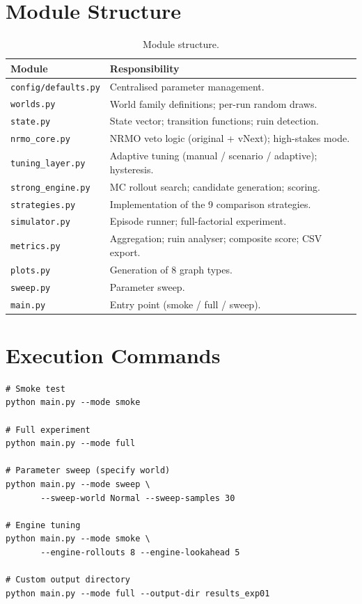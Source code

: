 \section{Module Structure}
\label{sec:vnext-modules}

\begin{table}[ht]
\centering
\small
\begin{tabularx}{\linewidth}{lX}
\toprule
\textbf{Module} & \textbf{Responsibility} \\
\midrule
\texttt{config/defaults.py}
& Centralised parameter management. \\
\texttt{worlds.py}
& World family definitions; per-run random draws. \\
\texttt{state.py}
& State vector; transition functions; ruin detection. \\
\texttt{nrmo\_core.py}
& NRMO veto logic (original + vNext); high-stakes mode. \\
\texttt{tuning\_layer.py}
& Adaptive tuning (manual / scenario / adaptive); hysteresis. \\
\texttt{strong\_engine.py}
& MC rollout search; candidate generation; scoring. \\
\texttt{strategies.py}
& Implementation of the 9 comparison strategies. \\
\texttt{simulator.py}
& Episode runner; full-factorial experiment. \\
\texttt{metrics.py}
& Aggregation; ruin analyser; composite score; CSV export. \\
\texttt{plots.py}
& Generation of 8 graph types. \\
\texttt{sweep.py}
& Parameter sweep. \\
\texttt{main.py}
& Entry point (smoke / full / sweep). \\
\bottomrule
\end{tabularx}
\caption[Module structure]{Module structure.}
\label{tab:vnext-modules}
\end{table}

\section{Execution Commands}
\label{sec:vnext-execution}

\begin{lstlisting}[basicstyle=\ttfamily\small,frame=single]
# Smoke test
python main.py --mode smoke

# Full experiment
python main.py --mode full

# Parameter sweep (specify world)
python main.py --mode sweep \
       --sweep-world Normal --sweep-samples 30

# Engine tuning
python main.py --mode smoke \
       --engine-rollouts 8 --engine-lookahead 5

# Custom output directory
python main.py --mode full --output-dir results_exp01
\end{lstlisting}

